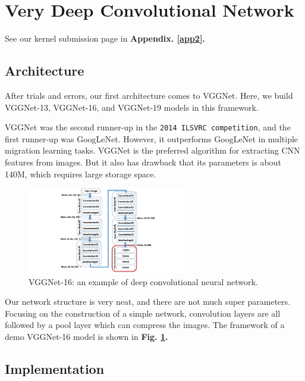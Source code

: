 \documentclass[10pt,twocolumn,letterpaper]{article}
\begin{document}

\section{Very Deep Convolutional Network} \label{SECVGG}

See our kernel submission page in \textbf{Appendix. \ref{app2}.}

\subsection{Architecture}

After trials and errors, our first architecture comes to \textsf{VGGNet}. Here, we build \textsf{VGGNet-13}, \textsf{VGGNet-16}, and \textsf{VGGNet-19} models in this framework.

\textsf{VGGNet} was the second runner-up in the \texttt{2014 ILSVRC competition}, and the first runner-up was \textsf{GoogLeNet}. However, it outperforms \textsf{GoogLeNet} in multiple migration learning tasks. \textsf{VGGNet} is the preferred algorithm for extracting CNN features from images. But it also has drawback that its parameters is about 140M, which requires large storage space.

\begin{figure}[h]
\centering
\includegraphics[width=7cm]{A-schematic-of-the-VGG-16-Deep-Convolutional-Neural-Network-DCNN-architecture-trained.png}
\caption{\textsf{VGGNet-16}: an example of deep convolutional neural network.}
\label{vgg16}
\end{figure}

Our network structure is very neat, and there are not much super parameters. Focusing on the construction of a simple network, convolution layers are all followed by a pool layer which can compress the images. The framework of a demo \textsf{VGGNet-16} model is shown in \textbf{Fig. \ref{vgg16}.} 

\subsection{Implementation}
\end{document}
